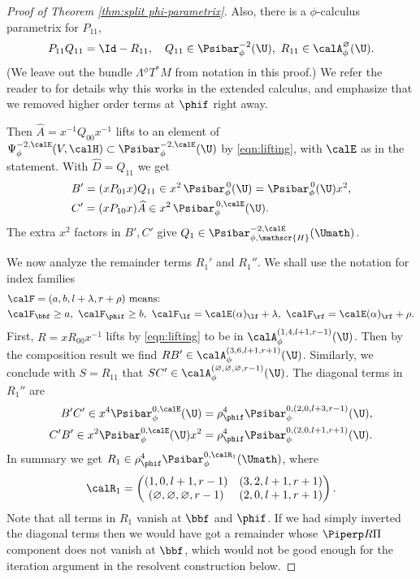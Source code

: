 \begin{proof}[Proof of Theorem \ref{thm:split phi-parametrix}]
Also, there is a $\phi$-calculus parametrix for $P_{11}$, \ie \begin{equation}
\label{eqn:Q11 R11}
P_{11}Q_{11}=\Id - R_{11},\quad
Q_{11}\in\Psibar^{-2}_\phi(\U),\ R_{11}\in \calA^{\varnothing}_{\phi} (\U).
\end{equation}
(We leave out the bundle $\Lambda {}^\phi T^*M$ from notation in this proof.)
We refer the reader to \cite[Prop.\,2]{grieser-para} for details why this works in the extended calculus,
and emphasize that we removed higher order terms at $\phif$ right away.

Then $\widehat{A}=x^{-1}Q_{00}x^{-1}$ lifts to an element of $\Psi_\phi^{-2,\calE}(V,\calH)\subset\Psibar_\phi^{-2,\calE}(\U)$
by \eqref{eqn:lifting}, with $\calE$ as in the statement. With $\widehat{D}=Q_{11}$ we get
\begin{align*}
&B'=(xP_{01}x) Q_{11}\in x^2\,\Psibar^{\,0}_\phi(\U)=\Psibar^{\,0}_\phi(\U) x^2, \\
&C'=(xP_{10}x) \widehat{A} \in x^2\,\Psibar_\phi^{\,0,\calE}(\U).
\end{align*}
The extra $x^2$ factors in $B',C'$ give $Q_1\in \Psibar_{\phi, \mathscr{H}}^{-2,\calE}(\Umath)$.

We now analyze the remainder terms $R_1'$ and $R_1''$.
We shall use the notation for index families
\begin{equation}
\label{eqn:index set tuples}
\begin{split}
&\calF = (a,b,l+\lambda,r+\rho) \ \text{means:}\\
&\calF_\bbf\geq a,\ \calF_\phif\geq b,\ \calF_\lf=\calE(\alpha)_\lf+\lambda,\ \calF_\rf=\calE(\alpha)_\rf+\rho.
\end{split}
\end{equation}
First, $R=xR_{00}x^{-1}$ lifts by \eqref{eqn:lifting}
to be in $\calA_{\phi}^{(1,4,l+1,r-1)}(\U)$. Then by the composition result
\cite[Th.\,9]{grieser-para} we find $RB' \in \calA_{\phi}^{(3,6,l+1,r+1)}(\U)$.
Similarly, we conclude with $S=R_{11}$ that $SC'\in \calA_{\phi}^{(\varnothing,\varnothing,\varnothing,r-1)}(\U)$.
The diagonal terms in $R_1''$ are
\begin{align*}
B'C'\in x^4\Psibar_\phi^{0,\calE}(\U)
&=\rho_\phif^4 \Psibar_\phi^{0,(2,0,l+3,r-1)}(\U), \\
C'B'\in x^2\Psibar_\phi^{0,\calE} (\U)x^2
&=\rho_\phif^4\Psibar_\phi^{0,(2,0,l+1,r+1)}(\U).
\end{align*}
In summary we get $R_1 \in \rho_\phif^4\Psibar_\phi^{0,\calR_1}(\Umath)$, where
\begin{equation}
\label{eqn:phi-param R1}
\calR_1 =
\begin{pmatrix}
(1,0,l+1,r-1) & (3,2,l+1,r+1) \\
(\varnothing,\varnothing,\varnothing,r-1) & (2,0,l+1,r+1)
\end{pmatrix}.
\end{equation}
Note that all terms in $R_1$ vanish at $\bbf$ and $\phif$. If we had simply inverted the
diagonal terms then we would have got a remainder whose $\Piperp R\Pi$ component
does not vanish at $\bbf$, which would not be good enough for the
iteration argument in the resolvent construction below.


\end{proof}
